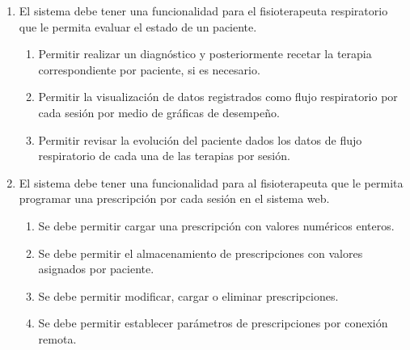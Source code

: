 \documentclass[12pt]{article}
\begin{document}
\begin{enumerate}[start=1,label={\bfseries RF0\arabic*.}]

    \item El sistema debe tener una funcionalidad para el fisioterapeuta respiratorio que le permita evaluar el estado de un paciente. 
        \label{RF01}
            \begin{enumerate}[label*=\arabic*.]
                \item Permitir realizar un diagnóstico y posteriormente recetar la terapia correspondiente por paciente, si es necesario.
                
                \item Permitir la visualización de datos registrados como flujo respiratorio por cada sesión por medio de gráficas de desempeño.
                
                \item Permitir revisar la evolución del paciente dados los datos de flujo respiratorio de cada una de las terapias por sesión.
        
            \end{enumerate}

    \item El sistema debe tener una funcionalidad para al fisioterapeuta que le permita programar  una prescripción por cada sesión en el sistema web.
        
        \label{RF02}
            \begin{enumerate}[label*=\arabic*.]
            
                \item Se debe permitir cargar una prescripción con valores numéricos enteros. %
                 
                \item Se debe permitir el almacenamiento de prescripciones con valores asignados por paciente. %
                
                \item Se debe permitir modificar, cargar o eliminar prescripciones.
                
                \item Se debe permitir establecer parámetros de prescripciones por conexión remota.
                

\end{enumerate}
\end{enumerate}
\end{document}
